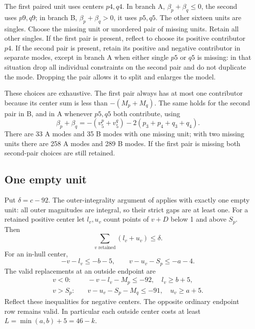 \documentclass[11pt,a4paper]{article}
\begin{document}
The first paired unit uses centers $p4,q4$. In branch A,
$\beta_p+\beta_q\le0$, the second uses $p9,q9$; in branch B,
$\beta_p+\beta_q>0$, it uses $p5,q5$. The other sixteen units are singles.
Choose the missing unit or unordered pair of missing units. Retain all
other singles. If the first pair is present, reflect to choose its
positive contributor $p4$. If the second pair is present, retain its
positive and negative contributor in separate modes, except in branch A
when either single $p5$ or $q5$ is missing: in that situation drop all
individual constraints on the second pair and do not duplicate the mode.
Dropping the pair allows it to split and enlarges the model.

These choices are exhaustive. The first pair always has at most one
contributor because its center sum is less than $-(M_p+M_q)$. The same
holds for the second pair in B, and in A whenever $p5,q5$ both contribute,
using
\[
 \beta_p+\beta_q=-(v^p_5+v^q_5)-2(p_3+p_4+q_3+q_4).
\]
There are 33 A modes and 35 B modes with one missing unit; with two
missing units there are 258 A modes and 289 B modes. If the first pair
is missing both second-pair choices are still retained.

\subsection{One empty unit}
Put $\delta=c-92$. The outer-integrality argument of \cite{base100}
applies with exactly one empty unit: all outer magnitudes are integral,
so their strict gaps are at least one. For a retained positive center
let $l_v,u_v$ count points of $v+D$ below 1 and above $S_p$. Then
\begin{equation}\label{eq:loss}
 \sum_{v\text{ retained}}(l_v+u_v)\le\delta.
\end{equation}
For an in-hull center,
\begin{equation}\label{eq:quantile}
 -v-l_v\le-b-5,\qquad v-u_v-S_p\le-a-4.
\end{equation}
The valid replacements at an outside endpoint are
\begin{align}
 v<0:&\quad -v-l_v-M_p\le-92,\quad l_v\ge b+5,\label{eq:lower-out}\\
 v>S_p:&\quad v-u_v-S_p-M_q\le-91,\quad u_v\ge a+5.\label{eq:upper-out}
\end{align}
Reflect these inequalities for negative centers. The opposite ordinary
endpoint row remains valid. In particular each outside center costs at
least $L=\min(a,b)+5=46-k$.
\end{document}
